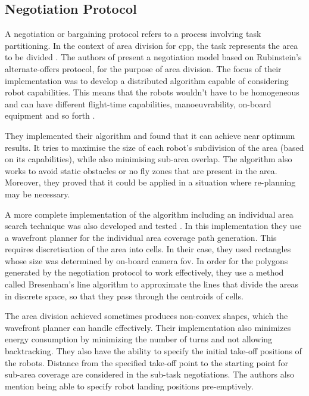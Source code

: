 \subsection{Negotiation Protocol}
\label{sec:Negotiation}
A negotiation or bargaining protocol refers to a process involving task partitioning. In the context of area division for \ac{cpp}, the task represents the area to be divided \cite{Rossi2009}. The authors of \cite{Rossi2009} present a negotiation model based on Rubinstein's alternate-offers protocol, for the purpose of area division. The focus of their implementation was to develop a distributed algorithm capable of considering robot capabilities. This means that the robots wouldn't have to be homogeneous and can have different flight-time capabilities, manoeuvrability, on-board equipment and so forth \cite{Barrientos2011}.

They implemented their algorithm and found that it can achieve near optimum results. It tries to maximise the size of each robot's subdivision of the area (based on its capabilities), while also minimising sub-area overlap. The algorithm also works to avoid static obstacles or no fly zones that are present in the area. Moreover, they proved that it could be applied in a situation where re-planning may be necessary.

A more complete implementation of the algorithm including an individual area search technique was also developed and tested \cite{Barrientos2011}. In this implementation they use a wavefront planner for the individual area coverage path generation. This requires discretisation of the area into cells. In their case, they used rectangles whose size was determined by on-board camera \ac{fov}. In order for the polygons generated by the negotiation protocol to work effectively, they use a method called Bresenham's line algorithm to approximate the lines that divide the areas in discrete space, so that they pass through the centroids of cells.

The area division achieved sometimes produces non-convex shapes, which the wavefront planner can handle effectively. Their implementation also minimizes energy consumption by minimizing the number of turns and not allowing backtracking. They also have the ability to specify the initial take-off positions of the robots. Distance from the specified take-off point to the starting point for sub-area coverage are considered in the sub-task negotiations. The authors also mention being able to specify robot landing positions pre-emptively.

